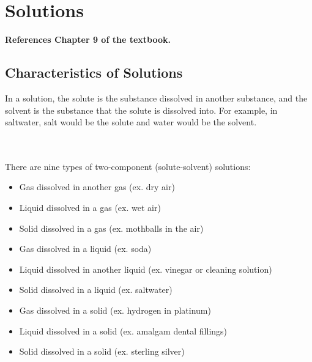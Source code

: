 \section{Solutions}

\textbf{References Chapter 9 of the textbook.}

\subsection{Characteristics of Solutions}

\begin{defn}
In a solution, the solute is the substance dissolved in another substance, and the solvent is the substance that the solute is dissolved into. For example, in saltwater, salt would be the solute and water would be the solvent.
\end{defn}

\noindent
{} \\

\noindent
{} \\

\noindent
There are nine types of two-component (solute-solvent) solutions:

\begin{itemize}
\item Gas dissolved in another gas (ex. dry air)
\item Liquid dissolved in a gas (ex. wet air)
\item Solid dissolved in a gas (ex. mothballs in the air)
\item Gas dissolved in a liquid (ex. soda)
\item Liquid dissolved in another liquid (ex. vinegar or cleaning solution)
\item Solid dissolved in a liquid (ex. saltwater)
\item Gas dissolved in a solid (ex. hydrogen in platinum)
\item Liquid dissolved in a solid (ex. amalgam dental fillings)
\item Solid dissolved in a solid (ex. sterling silver)
\end{itemize}

\noindent
{} \\

